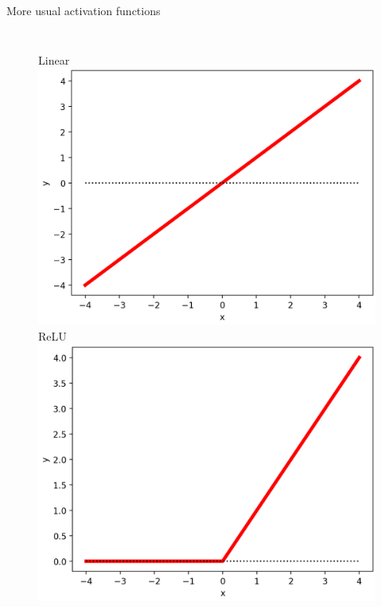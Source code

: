 \documentclass[handout, 10pt]{beamer}
\begin{document}
\begin{frame}{More usual activation functions}
\begin{columns}
    \begin{figure}
        \centering
        Linear\\
        \includegraphics[width=.85\textwidth]{fig/L2/activ-linear.png}\\
        ReLU\\
        \includegraphics[width=.85\textwidth]{fig/L2/activ-relu.png}\\


\end{figure}
\end{columns}
\end{frame}
\end{document}
